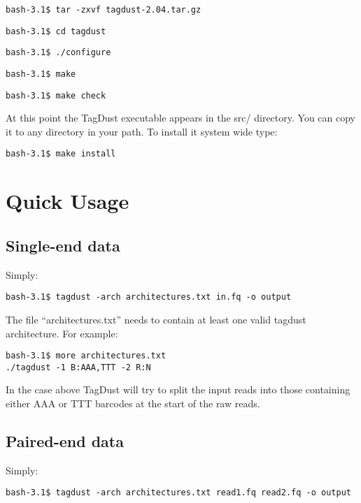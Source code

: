 \documentclass[11pt,a4paper,oneside]{book}
\begin{document}
\begin{verbatim}
bash-3.1$ tar -zxvf tagdust-2.04.tar.gz 
\end{verbatim}

\begin{verbatim}
bash-3.1$ cd tagdust
\end{verbatim}


\begin{verbatim}
bash-3.1$ ./configure
\end{verbatim}
\begin{verbatim}
bash-3.1$ make
\end{verbatim}

\begin{verbatim}
bash-3.1$ make check
\end{verbatim}
At this point the TagDust executable appears in the src/ directory. You can copy it to any directory in your path. To install it system wide type:  
\begin{verbatim}
bash-3.1$ make install
\end{verbatim}
\chapter{Quick Usage}

\section{Single-end data}

Simply:

\begin{verbatim}
bash-3.1$ tagdust -arch architectures.txt in.fq -o output
\end{verbatim}
The file ``architectures.txt'' needs to contain at least one valid tagdust architecture. For example: 
\begin{verbatim}
bash-3.1$ more architectures.txt
./tagdust -1 B:AAA,TTT -2 R:N 
\end{verbatim}

In the case above TagDust will try to split the input reads into those containing either AAA or TTT barcodes at the start of the raw reads. 

\section{Paired-end data}

Simply:

\begin{verbatim}
bash-3.1$ tagdust -arch architectures.txt read1.fq read2.fq -o output
\end{verbatim}
 
\end{document}
